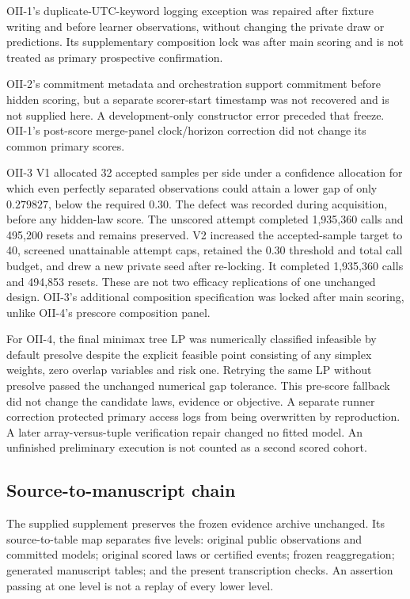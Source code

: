 OII-1's duplicate-UTC-keyword logging exception was repaired after fixture writing and before learner observations, without changing the private draw or predictions. Its supplementary composition lock was after main scoring and is not treated as primary prospective confirmation.

OII-2's commitment metadata and orchestration support commitment before hidden scoring, but a separate scorer-start timestamp was not recovered and is not supplied here. A development-only constructor error preceded that freeze. OII-1's post-score merge-panel clock/horizon correction did not change its common primary scores.

OII-3 V1 allocated 32 accepted samples per side under a confidence allocation for which even perfectly separated observations could attain a lower gap of only $0.279827$, below the required $0.30$. The defect was recorded during acquisition, before any hidden-law score. The unscored attempt completed 1,935,360 calls and 495,200 resets and remains preserved. V2 increased the accepted-sample target to 40, screened unattainable attempt caps, retained the $0.30$ threshold and total call budget, and drew a new private seed after re-locking. It completed 1,935,360 calls and 494,853 resets. These are not two efficacy replications of one unchanged design. OII-3's additional composition specification was locked after main scoring, unlike OII-4's prescore composition panel.

For OII-4, the final minimax tree LP was numerically classified infeasible by default presolve despite the explicit feasible point consisting of any simplex weights, zero overlap variables and risk one. Retrying the same LP without presolve passed the unchanged numerical gap tolerance. This pre-score fallback did not change the candidate laws, evidence or objective. A separate runner correction protected primary access logs from being overwritten by reproduction. A later array-versus-tuple verification repair changed no fitted model. An unfinished preliminary execution is not counted as a second scored cohort.

\subsection{Source-to-manuscript chain}
The supplied supplement preserves the frozen evidence archive unchanged. Its source-to-table map separates five levels: original public observations and committed models; original scored laws or certified events; frozen reaggregation; generated manuscript tables; and the present transcription checks. An assertion passing at one level is not a replay of every lower level.

